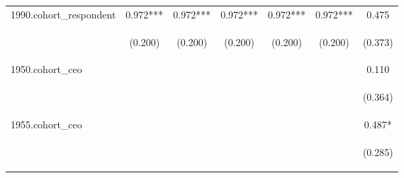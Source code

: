 \begin{center}
\begin{tabular}{lcccccc}
1990.cohort\_respondent & 0.972*** & 0.972*** & 0.972*** & 0.972*** & 0.972*** & 0.475 \\
\vspace{4pt} & \begin{footnotesize}(0.200)\end{footnotesize} & \begin{footnotesize}(0.200)\end{footnotesize} & \begin{footnotesize}(0.200)\end{footnotesize} & \begin{footnotesize}(0.200)\end{footnotesize} & \begin{footnotesize}(0.200)\end{footnotesize} & \begin{footnotesize}(0.373)\end{footnotesize} \\
1950.cohort\_ceo &  &  &  &  &  & 0.110 \\
\vspace{4pt} & \begin{footnotesize}\end{footnotesize} & \begin{footnotesize}\end{footnotesize} & \begin{footnotesize}\end{footnotesize} & \begin{footnotesize}\end{footnotesize} & \begin{footnotesize}\end{footnotesize} & \begin{footnotesize}(0.364)\end{footnotesize} \\
1955.cohort\_ceo &  &  &  &  &  & 0.487* \\
\vspace{4pt} & \begin{footnotesize}\end{footnotesize} & \begin{footnotesize}\end{footnotesize} & \begin{footnotesize}\end{footnotesize} & \begin{footnotesize}\end{footnotesize} & \begin{footnotesize}\end{footnotesize} & \begin{footnotesize}(0.285)\end{footnotesize} \\

\end{tabular}
\end{center}
